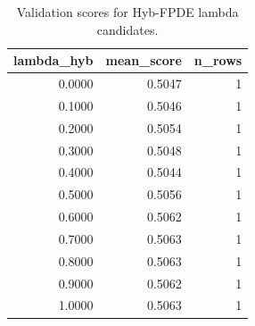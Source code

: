 \begin{table}[t]
\caption{Validation scores for Hyb-FPDE lambda candidates.}
\label{tab:lambda_distribution_computed}
\centering
\begin{tabular}{rrr}
\toprule
lambda\_hyb & mean\_score & n\_rows \\
\midrule
0.0000 & 0.5047 & 1 \\
0.1000 & 0.5046 & 1 \\
0.2000 & 0.5054 & 1 \\
0.3000 & 0.5048 & 1 \\
0.4000 & 0.5044 & 1 \\
0.5000 & 0.5056 & 1 \\
0.6000 & 0.5062 & 1 \\
0.7000 & 0.5063 & 1 \\
0.8000 & 0.5063 & 1 \\
0.9000 & 0.5062 & 1 \\
1.0000 & 0.5063 & 1 \\
\bottomrule
\end{tabular}

\end{table}
